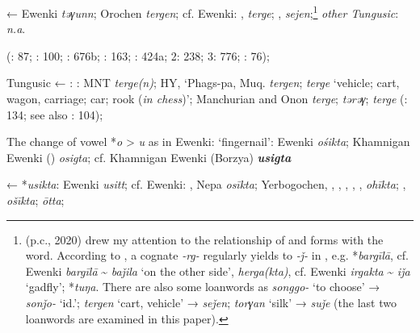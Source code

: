 \documentclass[output=paper,colorlinks,citecolor=brown]{langscibook}
\begin{document}
    ←  Ewenki \textit{tǝγunn}; Orochen \textit{tergen}; cf.  Ewenki: ,  \textit{terge}; ,  \textit{sejen};\footnote{ (p.c., 2020) drew my attention to the relationship of  and  forms with the  word. According to \citet{Norman1977}, a cognate \textit{-rg-} regularly yields to \textit{-ǰ-} in , e.g.  *\textit{bargīlā}, cf. Ewenki \textit{bargīlā} {\textasciitilde}  \textit{baǰila} ‘on the other side’,  \textit{herga(kta)}, cf. Ewenki \textit{irgakta} {\textasciitilde}  \textit{iǰa} ‘gadfly’;  *\textit{tuŋa}. There are also some  loanwords as \textit{songgo-} ‘to choose’ →  \textit{sonǰo-} ‘id.’;  \textit{tergen} ‘cart, vehicle’ →  \textit{seǰen};  \textit{torγan} ‘silk’ →  \textit{suǰe} (the last two  loanwords are examined in this paper).} \textit{other Tungusic}: \textit{n.a}.


    (\citealt{Castrén1856}: 87; \citealt{Janhunen1991}: 100; \citealt{Dorji1998}: 676b; \citealt{Chaoke2014a}: 163; \citealt{Vasilevic1958}: 424a; \citealt{Cincius1975B} 2: 238; \citealt{Hauer1952} 3: 776; \citealt{Stary1990}: 76);

    Tungusic ← : : MNT \textit{terge(n)}; HY, ‘Phags-pa, Muq. \textit{tergen};  \textit{terge} ‘vehicle; cart, wagon, carriage; car; rook (\textit{in chess})’; Manchurian and Onon  \textit{terge};  \textit{tǝrǝγ};  \textit{terge} (\citealt{Khabtagaeva2017}: 134; see also \citealt{Doerfer1985}: 104);
\z
\z


\ea
The change of vowel *\textit{o} > \textit{u} as in  Ewenki:
\ea  ‘fingernail’:  Ewenki \textit{ośikta}; Khamnigan Ewenki () \textit{osigta}; cf. Khamnigan Ewenki (Borzya) \textbf{\textit{usigta}}

    ← *\textit{usikta}:  Ewenki \textit{usitt}; cf.  Ewenki: , Nepa \textit{osīkta}; Yerbogochen, , , , , ,  \textit{ohīkta}; ,  \textit{ošīkta};  \textit{ōtta};
\end{document}
